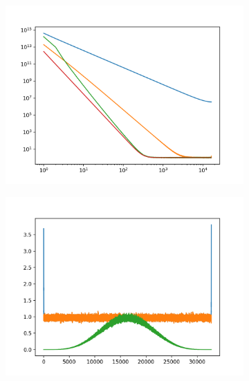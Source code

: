 \documentclass[12]{article}
\begin{document}
\begin{figure}
    \vspace{1cm}
    \begin{subfigure}[t]{0.45\textwidth}
    \centering
        \includegraphics[width=\linewidth]{plots/power_spectra_5.png}
    \end{subfigure}
    \hfill
    \begin{subfigure}[t]{0.45\textwidth}
      \centering
      \includegraphics[width=\linewidth]{plots/filtered_variance_5_3.png}

\end{subfigure}
\end{figure}
\end{document}

